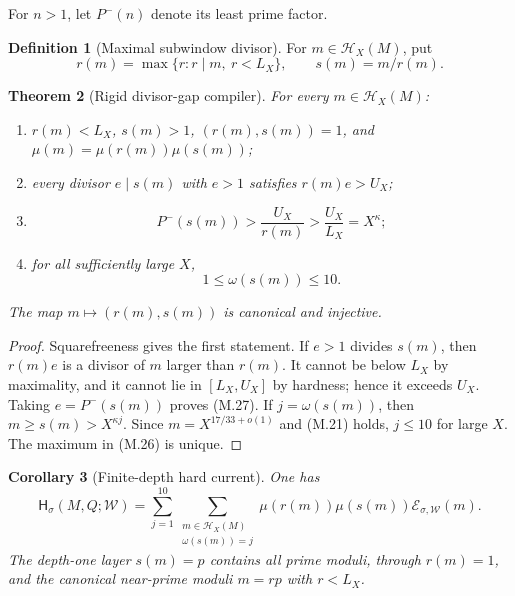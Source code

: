 \documentclass[11pt]{article}
\newtheorem{theorem}{Theorem}[section]
\newtheorem{corollary}[theorem]{Corollary}
\theoremstyle{definition}
\newtheorem{definition}[theorem]{Definition}
\theoremstyle{remark}
\begin{document}
For $n>1$, let $P^-(n)$ denote its least prime factor.

\begin{definition}[Maximal subwindow divisor]
\label{def:hard-maximal-divisor}
For $m\in\mathscr H_X(M)$, put
\[
 \boxed{
 r(m)=\max\{r:r\mid m,\ r<L_X\},
 \qquad s(m)=m/r(m).}
 \tag{M.26}
\]
\end{definition}

\begin{theorem}[Rigid divisor-gap compiler]
\label{thm:hard-gap}
For every $m\in\mathscr H_X(M)$:
\begin{enumerate}[label=\textup{(G\arabic*)},leftmargin=3.2em]
\item $r(m)<L_X$, $s(m)>1$, $(r(m),s(m))=1$, and
      $\mu(m)=\mu(r(m))\mu(s(m))$;
\item every divisor $e\mid s(m)$ with $e>1$ satisfies
      $r(m)e>U_X$;
\item
      \[
       \boxed{
       P^-(s(m))>\frac{U_X}{r(m)}
       >\frac{U_X}{L_X}=X^\kappa;}
       \tag{M.27}
      \]
\item for all sufficiently large $X$,
      \[
       \boxed{1\le\omega(s(m))\le10.}
       \tag{M.28}
      \]
\end{enumerate}
The map $m\mapsto(r(m),s(m))$ is canonical and injective.
\end{theorem}

\begin{proof}
Squarefreeness gives the first statement.  If $e>1$ divides $s(m)$, then
$r(m)e$ is a divisor of $m$ larger than $r(m)$.  It cannot be below $L_X$ by
maximality, and it cannot lie in $[L_X,U_X]$ by hardness; hence it exceeds
$U_X$.  Taking $e=P^-(s(m))$ proves \textup{(M.27)}.  If
$j=\omega(s(m))$, then $m\ge s(m)>X^{\kappa j}$.  Since
$m=X^{17/33+o(1)}$ and \textup{(M.21)} holds, $j\le10$ for large $X$.
The maximum in \textup{(M.26)} is unique.
\end{proof}

\begin{corollary}[Finite-depth hard current]
\label{cor:hard-depth}
One has
\[
 \boxed{
 \mathsf H_{\sigma}(M,Q;\mathscr W)
 =\sum_{j=1}^{10}
  \sum_{\substack{m\in\mathscr H_X(M)\\\omega(s(m))=j}}
  \mu(r(m))\mu(s(m))
  \mathcal E_{\sigma,\mathscr W}(m).}
 \tag{M.29}
\]
The depth-one layer $s(m)=p$ contains all prime moduli, through $r(m)=1$,
and the canonical near-prime moduli $m=rp$ with $r<L_X$.
\end{corollary}
\end{document}
